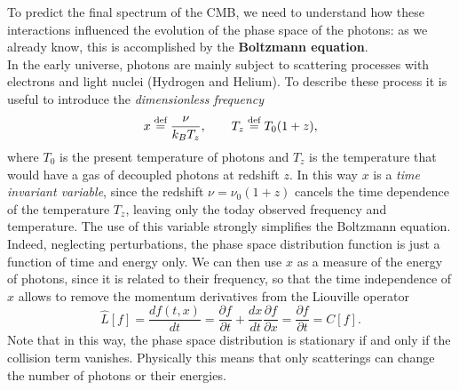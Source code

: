 To predict the final spectrum of the CMB, we need to understand how these interactions influenced the evolution of the phase space of the photons: as we already know, this is accomplished by the \textbf{Boltzmann equation}.\\ 
In the early universe, photons are mainly subject to scattering processes with electrons and light nuclei (Hydrogen and Helium). To describe these process it is useful to introduce the \emph{dimensionless frequency}
\begin{equation}\label{eq:dimensionless_frequency}
    x\stackrel{\text{def}}{=}\frac{\nu}{k_BT_z},\qquad T_z\stackrel{\text{def}}{=} T_0(1+z),
\end{equation}
where $T_0$ is the present temperature of photons and $T_z$ is the temperature that would have a gas of decoupled photons at redshift $z$. In this way $x$ is a \emph{time invariant variable}, since the redshift $\nu=\nu_0(1+z)$ cancels the time dependence of the temperature $T_z$, leaving only the today observed frequency and temperature. The use of this variable strongly simplifies the Boltzmann equation. Indeed, neglecting perturbations, the phase space distribution function is just a function of time and energy only. We can then use $x$ as a measure of the energy of photons, since it is related to their frequency, so that the time independence of $x$ allows to remove the momentum derivatives from the Liouville operator $$ \hat{L}[f]=\frac{df(t,x)}{dt}=\frac{\partial f}{\partial t}+\frac{dx}{dt}\frac{\partial f}{\partial x}=\frac{\partial f}{\partial t}=C[f].$$
Note that in this way, the phase space distribution is stationary if and only if the collision term vanishes. Physically this means that only scatterings can change the number of photons or their energies.

